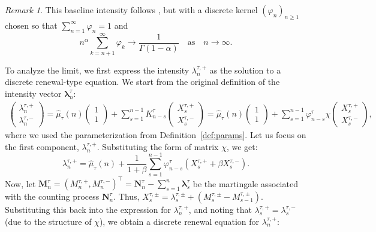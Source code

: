 \documentclass[letterpaper]{article}
\numberwithin{equation}{section}
\theoremstyle{definition}
\theoremstyle{remark}
\newtheorem{remark}[theorem]{Remark}
\begin{document}
\begin{remark}  
  This baseline intensity follows \cite[Definition~2.1]{el2019characteristic}, but with a discrete kernel $(\varphi_n)_{n\ge1}$ chosen so that $\sum_{n=1}^\infty \varphi_n=1$ and
  \[
    n^\alpha \sum_{k=n+1}^\infty \varphi_k \to \frac{1}{\Gamma(1-\alpha)}
    \quad \text{as} \quad n \to \infty.
  \]
\end{remark}

To analyze the limit, we first express the intensity $\lambda_n^{\tau,+}$ as the solution to a discrete renewal-type equation. We start from the original definition of the intensity vector $\boldsymbol{\lambda}_n^{\tau}$:
\begin{align*}
    \begin{pmatrix}
        \lambda_n^{\tau,+} \\
        \lambda_n^{\tau,-}
    \end{pmatrix}
    = \hat{\mu}_{\tau}(n) 
    \begin{pmatrix}
        1 \\
        1
    \end{pmatrix}
    + \sum_{s=1}^{n-1} K_{n-s}^{\tau}
    \begin{pmatrix}
        X_s^{\tau,+} \\
        X_s^{\tau,-}
    \end{pmatrix} 
    = \hat{\mu}_{\tau}(n) 
    \begin{pmatrix}
        1 \\
        1
    \end{pmatrix}
    + \sum_{s=1}^{n-1} \varphi_{n-s}^{\tau} \chi
    \begin{pmatrix}
        X_s^{\tau,+} \\
        X_s^{\tau,-}
    \end{pmatrix},
\end{align*}
where we used the parameterization from Definition~\ref{def:params}. Let us focus on the first component, $\lambda_n^{\tau,+}$. Substituting the form of matrix $\chi$, we get:
\[
  \lambda_n^{\tau,+} = \hat{\mu}_{\tau}(n) + \frac{1}{1+\beta} \sum_{s=1}^{n-1} \varphi_{n-s}^{\tau} \left(X_s^{\tau,+} + \beta X_s^{\tau,-}\right).
\]
Now, let $\mathbf M_n^{\tau}=(M_n^{\tau,+},M_n^{\tau,-})^\top=\mathbf N_n^{\tau}-\sum_{s=1}^{n}\boldsymbol\lambda_s^{\tau}$ be the martingale associated with the counting process $\mathbf N_n^{\tau}$. Thus, $X_s^{\tau,\pm} = \lambda_s^{\tau,\pm} + (M_s^{\tau,\pm} - M_{s-1}^{\tau,\pm})$. Substituting this back into the expression for $\lambda_n^{\tau,+}$, and noting that $\lambda_s^{\tau,+} = \lambda_s^{\tau,-}$ (due to the structure of $\chi$), we obtain a discrete renewal equation for $\lambda_n^{\tau,+}$:
\end{document}
